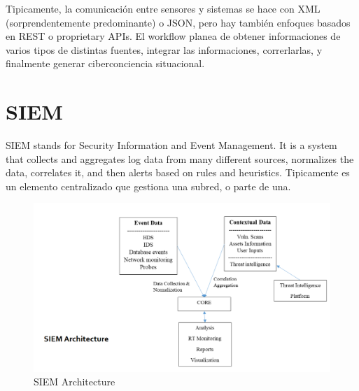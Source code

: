 Tipicamente, la comunicación entre sensores y sistemas se hace con XML (sorprendentemente predominante) o JSON, pero hay también enfoques basados en REST o proprietary APIs. El workflow planea de obtener informaciones de varios tipos de distintas fuentes, integrar las informaciones, correrlarlas, y finalmente generar ciberconciencia situacional.

\newpage
\section{SIEM}
\begin{paracol}{2}
   SIEM stands for Security Information and Event Management. It is a system that
   collects and aggregates log data from many different sources, normalizes the
   data, correlates it, and then alerts based on rules and heuristics.
   Tipicamente es un elemento centralizado que gestiona una subred, o parte de una.
   
   \switchcolumn

   \begin{figure}[htbp]
      \centering
      \includegraphics{images/04/SIEM.png}
      \caption{SIEM Architecture}
      \label{fig:04/SIEM}
   \end{figure}

\end{paracol}

